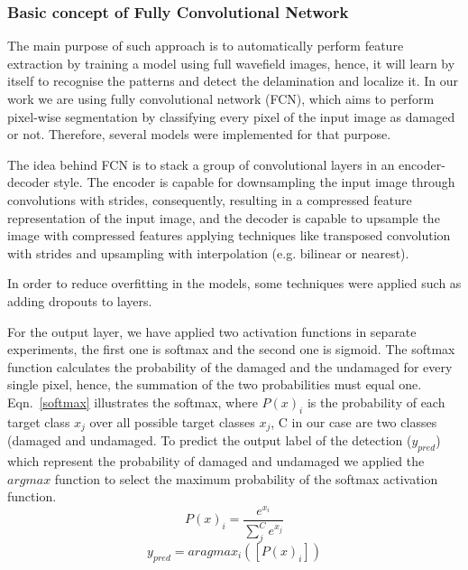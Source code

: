 \documentclass[preprint,9pt]{elsarticle}
\begin{document}
\subsubsection{Basic concept of Fully Convolutional Network}
The main purpose of such approach is to automatically perform feature extraction by training a model using full wavefield images, hence, it will learn by itself to recognise the patterns and detect the delamination and localize it.
In our work we are using fully convolutional network (FCN), which aims to perform pixel-wise segmentation by classifying every pixel of the input image as damaged or not. 
Therefore, several models were implemented for that purpose.

The idea behind FCN is to stack a group of convolutional layers in an encoder-decoder style. 
The encoder is capable for downsampling the input image through convolutions with strides, consequently, resulting in a compressed feature representation of the input image, and the decoder is capable to upsample the image with compressed features applying techniques like transposed convolution with strides and upsampling with interpolation (e.g. bilinear or nearest).


In order to reduce overfitting in the models, some techniques were applied such as adding dropouts to layers.

For the output layer, we have applied two activation functions in separate experiments, the first one is softmax and the second one is sigmoid. 
The softmax function calculates the probability of the damaged and the undamaged for every single pixel, hence, the summation of the two probabilities must equal one. Eqn.~\ref{softmax} illustrates the softmax, where \(P(x)_{i}\) is the probability of each target class \(x_{j}\) over all possible target classes \(x_{j}\), C in our case are two classes  (damaged and undamaged.
To predict the output label of the detection (\(y_{pred}\)) which represent the probability of damaged and undamaged we applied the \(argmax\) function to select the maximum probability of the softmax activation function.
\begin{equation}
P(x)_{i} = \frac{e^{x_{i}}}{\sum_{j}^{C} e^{x_{j}}}
\label{softmax}
\end{equation} 
\begin{equation}
y_{pred} = aragmax_{i}\left( \left[P(x)_{i}\right]\right)
\label{argmax}
\end{equation}
\end{document}
